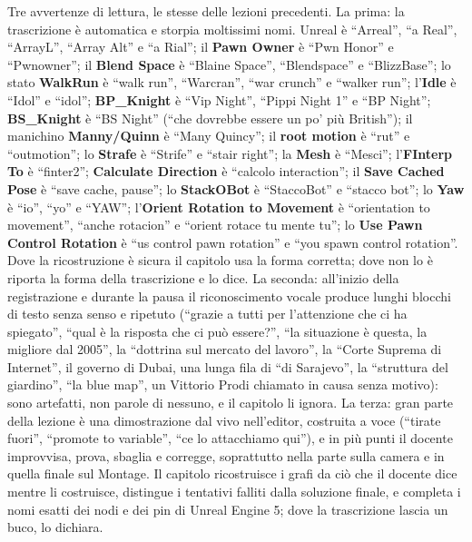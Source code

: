 Tre avvertenze di lettura, le stesse delle lezioni precedenti. La prima: la
trascrizione è automatica e storpia moltissimi nomi. Unreal è ``Arreal'', ``a Real'',
``ArrayL'', ``Array Alt'' e ``a Rial''; il \textbf{Pawn Owner} è ``Pwn Honor'' e
``Pwnowner''; il \textbf{Blend Space} è ``Blaine Space'', ``Blendspace'' e ``BlizzBase'';
lo stato \textbf{WalkRun} è ``walk run'', ``Warcran'', ``war crunch'' e ``walker run'';
l'\textbf{Idle} è ``Idol'' e ``idol''; \textbf{BP\_Knight} è ``Vip Night'', ``Pippi
Night 1'' e ``BP Night''; \textbf{BS\_Knight} è ``BS Night'' (``che dovrebbe essere un
po' più British''); il manichino \textbf{Manny/Quinn} è ``Many Quincy''; il
\textbf{root motion} è ``rut'' e ``outmotion''; lo \textbf{Strafe} è ``Strife'' e
``stair right''; la \textbf{Mesh} è ``Mesci''; l'\textbf{FInterp To} è ``finter2'';
\textbf{Calculate Direction} è ``calcolo interaction''; il \textbf{Save Cached Pose} è
``save cache, pause''; lo \textbf{StackOBot} è ``StaccoBot'' e ``stacco bot''; lo
\textbf{Yaw} è ``io'', ``yo'' e ``YAW''; l'\textbf{Orient Rotation to Movement} è
``orientation to movement'', ``anche rotacion'' e ``orient rotace tu mente tu''; lo
\textbf{Use Pawn Control Rotation} è ``us control pawn rotation'' e ``you spawn control
rotation''. Dove la ricostruzione è sicura il capitolo usa la forma corretta; dove non
lo è riporta la forma della trascrizione e lo dice. La seconda: all'inizio della
registrazione e durante la pausa il riconoscimento vocale produce lunghi blocchi di
testo senza senso e ripetuto (``grazie a tutti per l'attenzione che ci ha spiegato'',
``qual è la risposta che ci può essere?'', ``la situazione è questa, la migliore dal
2005'', la ``dottrina sul mercato del lavoro'', la ``Corte Suprema di Internet'', il
governo di Dubai, una lunga fila di ``di Sarajevo'', la ``struttura del giardino'', ``la
blue map'', un Vittorio Prodi chiamato in causa senza motivo): sono artefatti, non
parole di nessuno, e il capitolo li ignora. La terza: gran parte della lezione è una
dimostrazione dal vivo nell'editor, costruita a voce (``tirate fuori'', ``promote to
variable'', ``ce lo attacchiamo qui''), e in più punti il docente improvvisa, prova,
sbaglia e corregge, soprattutto nella parte sulla camera e in quella finale sul
Montage. Il capitolo ricostruisce i grafi da ciò che il docente dice mentre li
costruisce, distingue i tentativi falliti dalla soluzione finale, e completa i nomi
esatti dei nodi e dei pin di Unreal Engine 5; dove la trascrizione lascia un buco, lo
dichiara.

